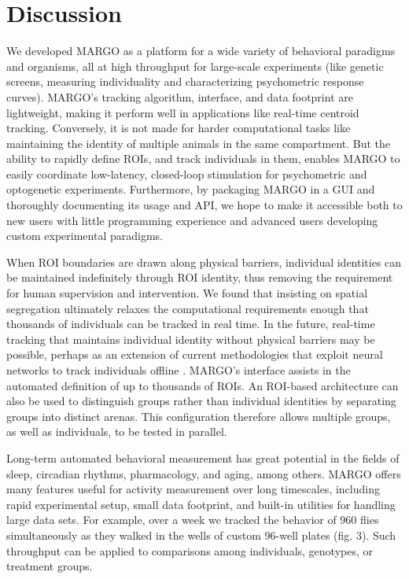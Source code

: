 \documentclass[12pt,letterpaper]{article}
\begin{document}
\section*{Discussion}
We developed MARGO as a platform for a wide variety of behavioral paradigms and organisms, all at high throughput for large-scale experiments (like genetic screens, measuring individuality and characterizing psychometric response curves). MARGO's tracking algorithm, interface, and data footprint are lightweight, making it perform well in applications like real-time centroid tracking. Conversely, it is not made for harder computational tasks like maintaining the identity of multiple animals in the same compartment. But the ability to rapidly define ROIs, and track individuals in them, enables MARGO to easily coordinate low-latency, closed-loop stimulation for psychometric and optogenetic experiments. Furthermore, by packaging MARGO in a GUI and thoroughly documenting its usage and API, we hope to make it accessible both to new users with little programming experience and advanced users developing custom experimental paradigms.

When ROI boundaries are drawn along physical barriers, individual identities can be maintained indefinitely through ROI identity, thus removing the requirement for human supervision and intervention. We found that insisting on spatial segregation ultimately relaxes the computational requirements enough that thousands of individuals can be tracked in real time. In the future, real-time tracking that maintains individual identity without physical barriers may be possible, perhaps as an extension of current methodologies that exploit neural networks to track individuals offline \cite{romero-ferrero_2019,schneider_2018}. MARGO's interface assists in the automated definition of up to thousands of ROIs. An ROI-based architecture can also be used to distinguish groups rather than individual identities by separating groups into distinct arenas. This configuration therefore allows multiple groups, as well as individuals, to be tested in parallel.

Long-term automated behavioral measurement has great potential in the fields of sleep, circadian rhythms, pharmacology, and aging, among others. MARGO offers many features useful for activity measurement over long timescales, including rapid experimental setup, small data footprint, and built-in utilities for handling large data sets. For example, over a week we tracked the behavior of 960 flies simultaneously as they walked in the wells of custom 96-well plates (fig. 3). Such throughput can be applied to comparisons among individuals, genotypes, or treatment groups. 
\end{document}
